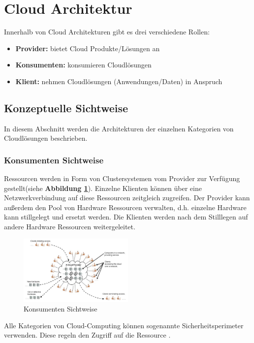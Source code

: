 \section{Cloud Architektur}

Innerhalb von Cloud Architekturen gibt es drei verschiedene Rollen:
\begin{itemize}
	\item \textbf{Provider:} bietet Cloud Produkte/Lösungen an
	\item \textbf{Konsumenten:} konsumieren Cloudlösungen
	\item \textbf{Klient:} nehmen Cloudlösungen (Anwendungen/Daten) in Anspruch
\end{itemize}

\subsection{Konzeptuelle Sichtweise}

In diesem Abschnitt werden die Architekturen der einzelnen Kategorien von Cloudlösungen beschrieben.

\subsubsection{Konsumenten Sichtweise}
Ressourcen werden in Form von Clustersystemen vom Provider zur Verfügung gestellt(siehe \textbf{Abbildung \ref{ConsumerView}}).
Einzelne Klienten können über eine Netzwerkverbindung auf diese Ressourcen zeitgleich zugreifen. Der Provider kann außerdem den Pool
von Hardware Ressourcen verwalten, d.h. einzelne Hardware kann stillgelegt und ersetzt werden. Die Klienten werden nach dem Stilllegen
auf andere Hardware Ressourcen weitergeleitet.
\begin{figure}[h]
    \centering
	\includegraphics[width=0.5\textwidth]{Images/ConsumerView}
	\caption{Konsumenten Sichtweise \cite{Badger}}
	\label{ConsumerView}
\end{figure}
Alle Kategorien von Cloud-Computing können sogenannte Sicherheitsperimeter verwenden. Diese regeln den Zugriff auf die Ressource \cite{Badger}.

